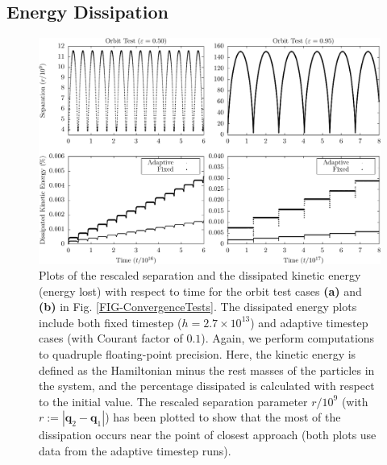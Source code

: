 \documentclass[aps,onecolumn,notitlepage,eqsecnum,nofootinbib,floatfix,superscriptaddress]{revtex4-1}
\begin{document}
%
%
\subsection{Energy Dissipation}
\label{sec_dissipation}

 \begin{figure}
 \includegraphics[width=\linewidth]{energy_tests.pdf}
\caption{Plots of the rescaled separation and the dissipated kinetic energy (energy lost) with respect to time for the orbit test cases \textbf{(a)} and \textbf{(b)} in Fig. \ref{FIG-ConvergenceTests}. The dissipated energy plots include both fixed timestep ($h=2.7 \times 10^{13}$) and adaptive timestep cases (with Courant factor of $0.1$). Again, we perform computations to quadruple floating-point precision. Here, the kinetic energy is defined as the Hamiltonian minus the rest masses of the particles in the system, and the percentage dissipated is calculated with respect to the initial value. The rescaled separation parameter $r/10^{9}$ (with $r:=|\textbf{q}_2-\textbf{q}_1|$) has been plotted to show that the most of the dissipation occurs near the point of closest approach (both plots use data from the adaptive timestep runs).}
\label{FIG-EnergyTests}
\end{figure}
\end{document}

